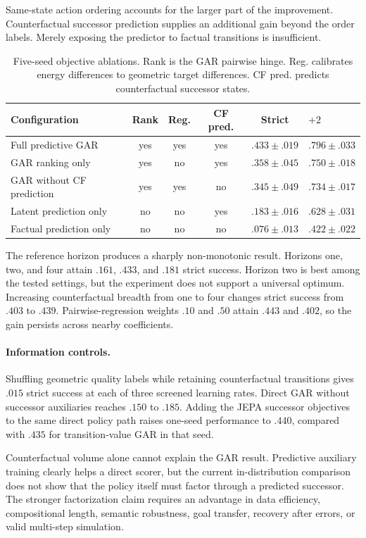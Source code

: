 Same-state action ordering accounts for the larger part of the improvement. Counterfactual successor prediction supplies an additional gain beyond the order labels. Merely exposing the predictor to factual transitions is insufficient.

\begin{table}[t]
\caption{Five-seed objective ablations. Rank is the GAR pairwise hinge. Reg. calibrates energy differences to geometric target differences. CF pred. predicts counterfactual successor states.}
\label{tab:central-ablation}
\centering
\small
\begin{tabular}{lccccl}
\toprule
Configuration & Rank & Reg. & CF pred. & Strict & $+2$ \\
\midrule
Full predictive GAR & yes & yes & yes & $.433\pm.019$ & $.796\pm.033$ \\
GAR ranking only & yes & no & yes & $.358\pm.045$ & $.750\pm.018$ \\
GAR without CF prediction & yes & yes & no & $.345\pm.049$ & $.734\pm.017$ \\
Latent prediction only & no & no & yes & $.183\pm.016$ & $.628\pm.031$ \\
Factual prediction only & no & no & no & $.076\pm.013$ & $.422\pm.022$ \\
\bottomrule
\end{tabular}
\end{table}

The reference horizon produces a sharply non-monotonic result. Horizons one, two, and four attain $.161$, $.433$, and $.181$ strict success. Horizon two is best among the tested settings, but the experiment does not support a universal optimum. Increasing counterfactual breadth from one to four changes strict success from $.403$ to $.439$. Pairwise-regression weights $.10$ and $.50$ attain $.443$ and $.402$, so the gain persists across nearby coefficients.

\paragraph{Information controls.}
Shuffling geometric quality labels while retaining counterfactual transitions gives $.015$ strict success at each of three screened learning rates. Direct GAR without successor auxiliaries reaches $.150$ to $.185$. Adding the JEPA successor objectives to the same direct policy path raises one-seed performance to $.440$, compared with $.435$ for transition-value GAR in that seed.

Counterfactual volume alone cannot explain the GAR result. Predictive auxiliary training clearly helps a direct scorer, but the current in-distribution comparison does not show that the policy itself must factor through a predicted successor. The stronger factorization claim requires an advantage in data efficiency, compositional length, semantic robustness, goal transfer, recovery after errors, or valid multi-step simulation.
